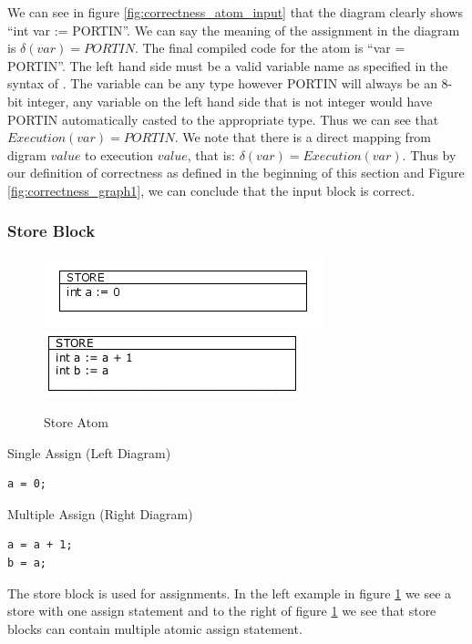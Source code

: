 We can see in figure \ref{fig:correctness_atom_input} that the diagram clearly shows ``int var := PORTIN''. We can say the meaning of the assignment in the diagram is $\delta(var) = PORTIN$. The final compiled code for the atom is ``var = PORTIN''. The left hand side must be a valid variable name as specified in the syntax of \plccharts. The variable can be any type however PORTIN will always be an 8-bit integer, any variable on the left hand side that is not integer would have PORTIN automatically casted to the appropriate type. Thus we can see that $Execution(var) = PORTIN$. We note that there is a direct mapping from digram $value$ to execution $value$, that is: $\delta(var) = Execution(var)$. Thus by our definition of correctness as defined in the beginning of this section and Figure \ref{fig:correctness_graph1}, we can conclude that the input block is correct.


\subsubsection{Store Block}

\begin{figure}[h]
	\centering
	\includegraphics[width=\imgmedphoto]{./images/correctness_atom_store_single.png}
	\includegraphics[width=\imgmedphoto]{./images/correctness_atom_store.png}
	\caption{Store Atom}
	\label{fig:correctness_atom_store}
\end{figure}

Single Assign (Left Diagram)
\begin{lstlisting}[frame=single]
a = 0;
\end{lstlisting}

Multiple Assign (Right Diagram)
\begin{lstlisting}[frame=single]
a = a + 1;
b = a;
\end{lstlisting}

The store block is used for assignments. In the left example in figure \ref{fig:correctness_atom_store} we see a store with one assign statement and to the right of figure \ref{fig:correctness_atom_store} we see that store blocks can contain multiple atomic assign statement. 

